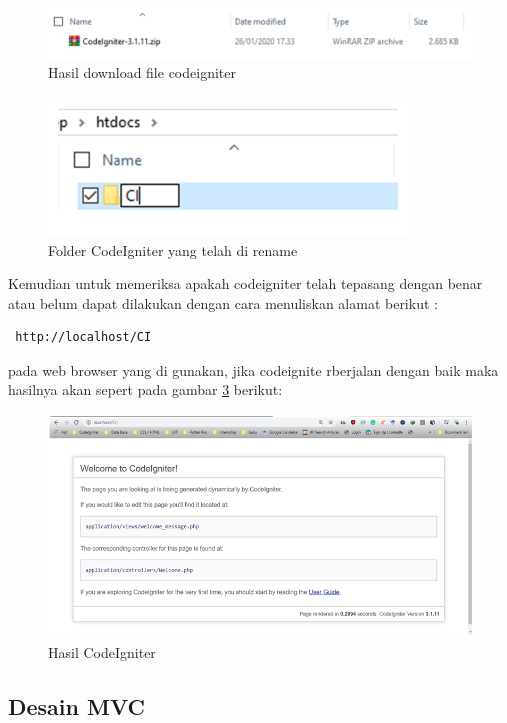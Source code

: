 \begin{figure}[!htbp]
	\centerline{\includegraphics[width=1\textwidth]{figures/ci/3.png}}
	\caption{Hasil download file codeigniter}
	\label{C3}
\end{figure}
\begin{figure}[!htbp]
	\centerline{\includegraphics[width=0.85\textwidth]{figures/ci/4.png}}
	\caption{Folder CodeIgniter yang telah di rename}
	\label{C4}
\end{figure}
\pagebreak
Kemudian untuk memeriksa apakah codeigniter telah tepasang dengan benar atau belum dapat dilakukan dengan cara menuliskan alamat berikut :
 \begin{verbatim} http://localhost/CI \end{verbatim}

pada web browser yang di gunakan, jika codeignite rberjalan dengan baik maka hasilnya akan sepert pada gambar \ref{C5} berikut:
\begin{figure}[!htbp]
	\centerline{\includegraphics[width=1\textwidth]{figures/ci/5.png}}
	\caption{Hasil CodeIgniter}
	\label{C5}
\end{figure}
\subsection{Desain MVC}

